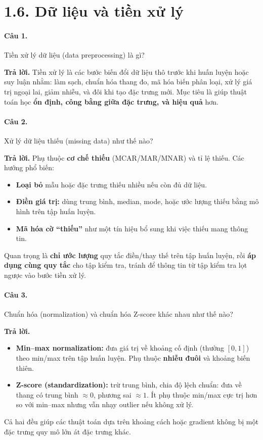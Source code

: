 \section*{1.6. Dữ liệu và tiền xử lý}

\paragraph{Câu 1.} Tiền xử lý dữ liệu (data preprocessing) là gì?

\medskip\noindent\textbf{Trả lời.} Tiền xử lý là các bước biến đổi dữ liệu thô trước khi huấn luyện hoặc suy luận nhằm: làm sạch, chuẩn hóa thang đo, mã hóa biến phân loại, xử lý giá trị ngoại lai, giảm nhiễu, và đôi khi tạo đặc trưng mới. Mục tiêu là giúp thuật toán học \textbf{ổn định, công bằng giữa đặc trưng, và hiệu quả} hơn.

\paragraph{Câu 2.} Xử lý dữ liệu thiếu (missing data) như thế nào?

\medskip\noindent\textbf{Trả lời.} Phụ thuộc \textbf{cơ chế thiếu} (MCAR/MAR/MNAR) và tỉ lệ thiếu. Các hướng phổ biến:
\begin{itemize}[nosep]
\item \textbf{Loại bỏ} mẫu hoặc đặc trưng thiếu nhiều nếu còn đủ dữ liệu.
\item \textbf{Điền giá trị:} dùng trung bình, median, mode, hoặc ước lượng thiếu bằng mô hình trên tập huấn luyện.
\item \textbf{Mã hóa cờ ``thiếu''} như một tín hiệu bổ sung khi việc thiếu mang thông tin.
\end{itemize}
Quan trọng là \textbf{chỉ ước lượng} quy tắc điền/thay thế trên tập huấn luyện, rồi \textbf{áp dụng cùng quy tắc} cho tập kiểm tra, tránh để thông tin từ tập kiểm tra lọt ngược vào bước tiền xử lý.

\paragraph{Câu 3.} Chuẩn hóa (normalization) và chuẩn hóa Z-score khác nhau như thế nào?

\medskip\noindent\textbf{Trả lời.}
\begin{itemize}[nosep]
\item \textbf{Min--max normalization:} đưa giá trị về khoảng cố định (thường $[0,1]$) theo min/max trên tập huấn luyện. Phụ thuộc \textbf{nhiễu đuôi} và khoảng biến thiên.
\item \textbf{Z-score (standardization):} trừ trung bình, chia độ lệch chuẩn: đưa về thang có trung bình $\approx 0$, phương sai $\approx 1$. Ít phụ thuộc min/max cực trị hơn so với min--max nhưng vẫn nhạy outlier nếu không xử lý.
\end{itemize}
Cả hai đều giúp các thuật toán dựa trên khoảng cách hoặc gradient không bị một đặc trưng quy mô lớn át đặc trưng khác.


